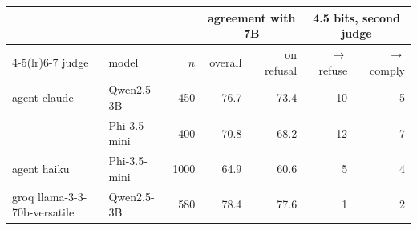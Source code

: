 \begin{tabular}{llrrrrr}
\toprule
& & & \multicolumn{2}{c}{agreement with 7B} & \multicolumn{2}{c}{4.5 bits, second judge} \\
\cmidrule(lr){4-5}\cmidrule(lr){6-7}
judge & model & $n$ & overall & on refusal & $\to$refuse & $\to$comply \\
\midrule
agent claude & Qwen2.5-3B & 450 & 76.7 & 73.4 & 10 & 5 \\
 & Phi-3.5-mini & 400 & 70.8 & 68.2 & 12 & 7 \\
agent haiku & Phi-3.5-mini & 1000 & 64.9 & 60.6 & 5 & 4 \\
groq llama-3-3-70b-versatile & Qwen2.5-3B & 580 & 78.4 & 77.6 & 1 & 2 \\
\bottomrule
\end{tabular}
